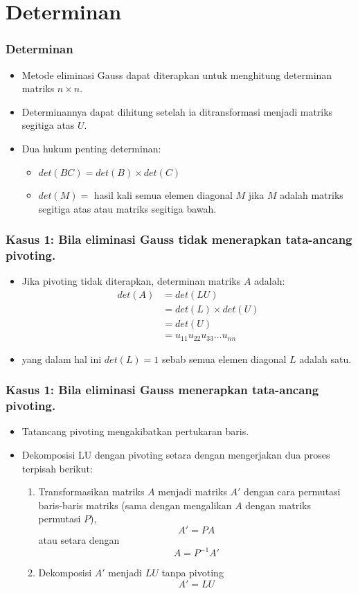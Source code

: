 \documentclass[pdflatex,compress,mathserif]{beamer}
\begin{document}
\section{Determinan}

\begin{frame}
	\frametitle{Determinan}
	\begin{itemize}
		\item Metode eliminasi Gauss dapat diterapkan untuk menghitung
		determinan matriks $ n \times n $.
		\item Determinannya dapat dihitung setelah ia ditransformasi menjadi matriks segitiga atas $ U $.
		\item Dua hukum penting determinan:
		\begin{itemize}
			\item $ det(BC) = det(B) \times det(C) $
			\item $ det(M) = $ hasil kali semua elemen diagonal $ M $ jika $ M $ adalah matriks segitiga atas atau matriks segitiga
			bawah.
		\end{itemize}
	\end{itemize}
\end{frame}

\begin{frame}
	\frametitle{Kasus 1: Bila eliminasi Gauss tidak menerapkan tata-ancang pivoting.}
	\begin{itemize}
		\item Jika pivoting tidak diterapkan, determinan matriks $ A $
		adalah:
		\begin{align*}
			det(A) &= det(LU) \\
			&= det(L) \times det(U) \\
			&= det(U) \\
			&= u_{11}u_{22}u_{33} \dots u_{nn}
		\end{align*}
		\item yang dalam hal ini $ det(L) = 1 $ sebab semua elemen diagonal $ L $ adalah satu.
	\end{itemize}
\end{frame}

\begin{frame}
	\frametitle{Kasus 1: Bila eliminasi Gauss menerapkan tata-ancang pivoting.}
	\begin{itemize}
		\item Tatancang pivoting mengakibatkan pertukaran baris.
		\item Dekomposisi LU dengan pivoting setara dengan mengerjakan dua proses terpisah berikut:
		\begin{enumerate}
			\item Transformasikan matriks $ A $ menjadi matriks $ A' $ dengan cara permutasi baris-baris matriks (sama dengan mengalikan $ A $ dengan matriks permutasi $ P $),
			\[ A' = PA \] atau setara dengan \[ A = P^{-1}A' \]
			\item Dekomposisi $ A' $ menjadi $ LU $ tanpa pivoting
			\[A' = LU\]
		\end{enumerate}
	\end{itemize}
\end{frame}
\end{document}

